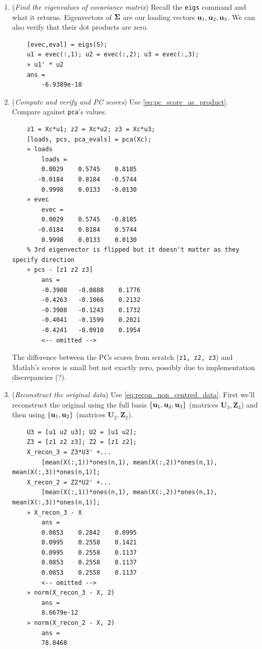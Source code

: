 \documentclass[a4paper]{article}
\begin{document}
\begin{enumerate}
    \item (\textit{Find the eigenvalues of covariance matrix}) Recall the \texttt{eigs} command and what it returns. Eigenvectors of $\boldsymbol{\Sigma}$ are our loading vectors $\textbf{u}_1,\textbf{u}_2,\textbf{u}_3$. We can also verify that their dot products are zero.
    \begin{verbatim}
    [evec,eval] = eigs(S);
    u1 = evec(:,1); u2 = evec(:,2); u3 = evec(:,3);
    » u1' * u2
    ans =
        -6.9389e-18
    \end{verbatim}
    \item (\textit{Compute and verify and PC scores}) Use \eqref{eq:pc_score_as_product}. Compare against \texttt{pca}'s values.
    \begin{verbatim}
    z1 = Xc*u1; z2 = Xc*u2; z3 = Xc*u3;     
    [loads, pcs, pca_evals] = pca(Xc);
    » loads
        loads =
        0.0029    0.5745    0.8185
       -0.0184    0.8184   -0.5744
        0.9998    0.0133   -0.0130
    » evec
        evec =
        0.0029    0.5745   -0.8185
       -0.0184    0.8184    0.5744
        0.9998    0.0133    0.0130
    % 3rd eigenvector is flipped but it doesn't matter as they specify direction
    » pcs - [z1 z2 z3]
        ans =
        -0.3908   -0.0888    0.1776
        -0.4263   -0.1066    0.2132
        -0.3908   -0.1243    0.1732
        -0.4041   -0.1599    0.2021
        -0.4241   -0.0910    0.1954
        <-- omitted -->
    \end{verbatim}
    The difference between the PCs scores from scratch (\texttt{z1, z2, z3}) and Matlab's scores is small but not exactly zero, possibly due to implementation discrepancies (?).
    \item (\textit{Reconstruct the original data}) Use \eqref{eq:recon_non_centred_data}. First we'll reconstruct the original using the full basis $\{\textbf{u}_1,\textbf{u}_2,\textbf{u}_3 \}$ (matrices $\textbf{U}_3,\textbf{Z}_3$) and then using $\{\textbf{u}_1,\textbf{u}_2\}$ (matrices $\textbf{U}_2,\textbf{Z}_2$).  
    \begin{verbatim}
    U3 = [u1 u2 u3]; U2 = [u1 u2];
    Z3 = [z1 z2 z3]; Z2 = [z1 z2];
    X_recon_3 = Z3*U3' +...
        [mean(X(:,1))*ones(n,1), mean(X(:,2))*ones(n,1), mean(X(:,3))*ones(n,1)];
    X_recon_2 = Z2*U2' +...
        [mean(X(:,1))*ones(n,1), mean(X(:,2))*ones(n,1), mean(X(:,3))*ones(n,1)];
    » X_recon_3 - X
        ans =
        0.0853    0.2842    0.0995
        0.0995    0.2558    0.1421
        0.0995    0.2558    0.1137
        0.0853    0.2558    0.1137
        0.0853    0.2558    0.1137
        <-- omitted -->
    » norm(X_recon_3 - X, 2)
        ans =
        8.6679e-12
    » norm(X_recon_2 - X, 2)
        ans =
        78.0468
    \end{verbatim}
\end{enumerate}
\end{document}
